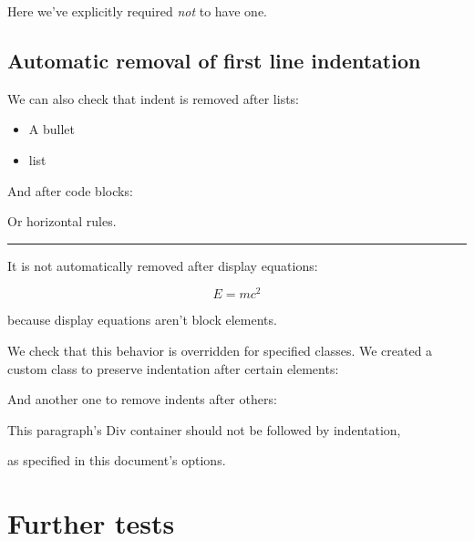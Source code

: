 \noindent Here we've explicitly required \emph{not} to have one.

\subsection{Automatic removal of first line
indentation}\label{automatic-removal-of-first-line-indentation}

We can also check that indent is removed after lists:

\begin{itemize}
\tightlist
\item
  A bullet
\item
  list
\end{itemize}

\noindent And after code blocks:

\begin{Shaded}
\begin{Highlighting}[]
  \OperatorTok{=} 
\end{Highlighting}
\end{Shaded}

\noindent Or horizontal rules.

\begin{center}\rule{0.5\linewidth}{0.5pt}\end{center}

\noindent It is not automatically removed after display equations:

\[E = mc^2\]

because display equations aren't block elements.

We check that this behavior is overridden for specified classes. We
created a custom class to preserve indentation after certain elements:

\begin{Shaded}
\begin{Highlighting}[]
\end{Highlighting}
\end{Shaded}

And another one to remove indents after others:

This paragraph's Div container should not be followed by indentation,

\noindent as specified in this document's options.

\section{Further tests}\label{further-tests}

